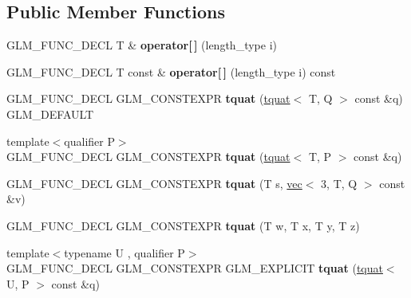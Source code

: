 \subsection*{Public Member Functions}
\begin{DoxyCompactItemize}
\item 
\mbox{\label{structglm_1_1tquat_a0676fa7abe008f2912d296f6b3a569cf}} 
G\+L\+M\+\_\+\+F\+U\+N\+C\+\_\+\+D\+E\+CL T \& {\bfseries operator\mbox{[}$\,$\mbox{]}} (length\+\_\+type i)
\item 
\mbox{\label{structglm_1_1tquat_a88fc5911dc554c71f5933d2fb99a7a7a}} 
G\+L\+M\+\_\+\+F\+U\+N\+C\+\_\+\+D\+E\+CL T const  \& {\bfseries operator\mbox{[}$\,$\mbox{]}} (length\+\_\+type i) const
\item 
\mbox{\label{structglm_1_1tquat_a2711d3970e6aeeade71debf8a9b5c012}} 
G\+L\+M\+\_\+\+F\+U\+N\+C\+\_\+\+D\+E\+CL G\+L\+M\+\_\+\+C\+O\+N\+S\+T\+E\+X\+PR {\bfseries tquat} (\hyperlink{structglm_1_1tquat}{tquat}$<$ T, Q $>$ const \&q) G\+L\+M\+\_\+\+D\+E\+F\+A\+U\+LT
\item 
\mbox{\label{structglm_1_1tquat_ac6d649e6c91a6bdcf324f870010a81bb}} 
{\footnotesize template$<$qualifier P$>$ }\\G\+L\+M\+\_\+\+F\+U\+N\+C\+\_\+\+D\+E\+CL G\+L\+M\+\_\+\+C\+O\+N\+S\+T\+E\+X\+PR {\bfseries tquat} (\hyperlink{structglm_1_1tquat}{tquat}$<$ T, P $>$ const \&q)
\item 
\mbox{\label{structglm_1_1tquat_a5abf4c68775ef307edb54e7e0bdf85ca}} 
G\+L\+M\+\_\+\+F\+U\+N\+C\+\_\+\+D\+E\+CL G\+L\+M\+\_\+\+C\+O\+N\+S\+T\+E\+X\+PR {\bfseries tquat} (T s, \hyperlink{structglm_1_1vec}{vec}$<$ 3, T, Q $>$ const \&v)
\item 
\mbox{\label{structglm_1_1tquat_a8b6304133e69ca2166eb8e467c79ce71}} 
G\+L\+M\+\_\+\+F\+U\+N\+C\+\_\+\+D\+E\+CL G\+L\+M\+\_\+\+C\+O\+N\+S\+T\+E\+X\+PR {\bfseries tquat} (T w, T x, T y, T z)
\item 
\mbox{\label{structglm_1_1tquat_a8d341e16c31f258a3550123eea5671f0}} 
{\footnotesize template$<$typename U , qualifier P$>$ }\\G\+L\+M\+\_\+\+F\+U\+N\+C\+\_\+\+D\+E\+CL G\+L\+M\+\_\+\+C\+O\+N\+S\+T\+E\+X\+PR G\+L\+M\+\_\+\+E\+X\+P\+L\+I\+C\+IT {\bfseries tquat} (\hyperlink{structglm_1_1tquat}{tquat}$<$ U, P $>$ const \&q)

\end{DoxyCompactItemize}

